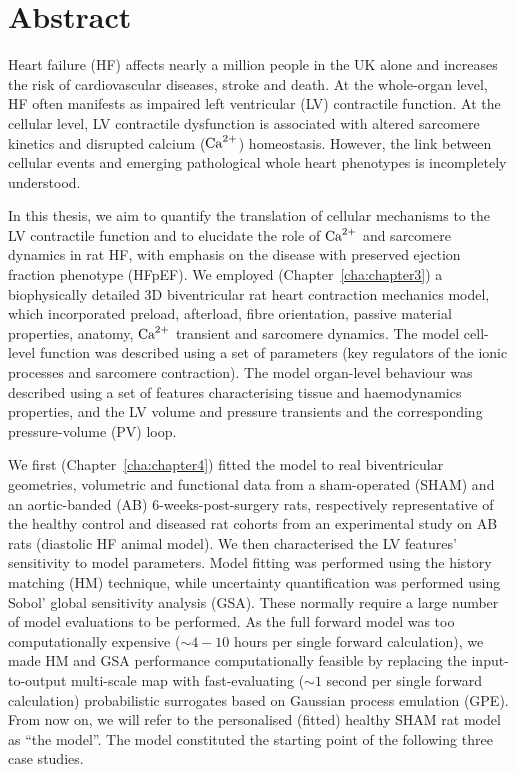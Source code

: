 
\begingroup

\let\clearpage\relax
\let\cleardoublepage\relax
\let\cleardoublepage\relax

\chapter*{Abstract}
Heart failure (HF) affects nearly a million people in the UK alone and increases the risk of cardiovascular diseases, stroke and death. At the whole-organ level, HF often manifests as impaired left ventricular (LV) contractile function. At the cellular level, LV contractile dysfunction is associated with altered sarcomere kinetics and disrupted calcium ($\textrm{Ca}^{2+}$) homeostasis. However, the link between cellular events and emerging pathological whole heart phenotypes is incompletely understood.

\vspace{0.2cm}
In this thesis, we aim to quantify the translation of cellular mechanisms to the LV contractile function and to elucidate the role of $\textrm{Ca}^{2+}$ and sarcomere dynamics in rat HF, with emphasis on the disease with preserved ejection fraction phenotype (HFpEF). We employed (Chapter~\ref{cha:chapter3}) a biophysically detailed 3D biventricular rat heart contraction mechanics model, which incorporated preload, afterload, fibre orientation, passive material properties, anatomy, $\textrm{Ca}^{2+}$ transient and sarcomere dynamics. The model cell-level function was described using a set of parameters (key regulators of the ionic processes and sarcomere contraction). The model organ-level behaviour was described using a set of features characterising tissue and haemodynamics properties, and the LV volume and pressure transients and the corresponding pressure-volume (PV) loop.

\vspace{0.2cm}
We first (Chapter~\ref{cha:chapter4}) fitted the model to real biventricular geometries, volumetric and functional data from a sham-operated (SHAM) and an aortic-banded (AB) 6-weeks-post-surgery rats, respectively representative of the healthy control and diseased rat cohorts from an experimental study on AB rats (diastolic HF animal model). We then characterised the LV features' sensitivity to model parameters. Model fitting was performed using the history matching (HM) technique, while uncertainty quantification was performed using Sobol' global sensitivity analysis (GSA). These normally require a large number of model evaluations to be performed. As the full forward model was too computationally expensive ($\sim 4-10$ hours per single forward calculation), we made HM and GSA performance computationally feasible by replacing the input-to-output multi-scale map with fast-evaluating ($\sim 1$ second per single forward calculation) probabilistic surrogates based on Gaussian process emulation (GPE). From now on, we will refer to the personalised (fitted) healthy SHAM rat model as ``the model''. The model constituted the starting point of the following three case studies.

